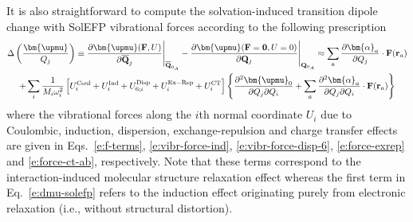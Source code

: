 \documentclass[a4paper,titlepage,twoside,fleqn,12pt]{book}
\newcommand{\BM}[1]{\bm{#1}}
\newcommand{\fderiv}[2]{\ensuremath{
    \frac{\partial #1}{\partial #2}}}
\newcommand{\sderivd}[3]{\ensuremath{
    \frac{\partial^2 #1}{\partial #2 \partial #3}
    }}
\begin{document}
\begin{refsection}
It is also straightforward to compute the 
solvation\hyp{}induced transition dipole change
with SolEFP vibrational forces according to the following prescription
%
\begin{multline} \label{e:dmu-solefp}
\Delta\left(\frac{{\BM \upmu}}{Q_j}\right) \equiv 
 \frac{\partial{\BM \upmu}({\bf F},U)}{\partial\overline {\bf Q}_j} \Bigg|_{\overline{\bf Q}_{0_A}} -  
 \frac{\partial{\BM \upmu}({\bf F}={\bf 0},U=0)}{\partial {\bf Q}_j} \Bigg|_{{\bf Q}_{0_A}} \approx
%
\sum_a 
\fderiv{{\BM \alpha}_{a}}{Q_j} \cdot {\bf F}({\bf r}_a) \\
+
\sum_i 
\frac{1}{M_i\omega_i^2} 
\left[
 U^{\rm Coul}_i   + 
 U^{\rm Ind}_i    +
 U^{\rm Disp}_{6;i}   +
 U^{\rm Ex-Rep}_i +
 U^{\rm CT}_i
\right]
%
\left\{ 
 \sderivd{{\BM \upmu}_0}{Q_j}{Q_i} 
 + \sum_a \sderivd{{\BM \alpha}_{a}}{Q_j}{Q_i} \cdot {\bf F}({\bf r}_a)
%
\right\}  
\end{multline}
%
where the vibrational forces along the $i$th normal coordinate
$U_i$ due to Coulombic, induction, dispersion, exchange\hyp{}repulsion
and charge transfer effects are given in Eqs.~\eqref{e:f-terms},
\eqref{e:vibr-force-ind}, \eqref{e:vibr-force-disp-6}, 
\eqref{e:force-exrep} and \eqref{e:force-ct-ab}, respectively.
Note that these terms correspond to the interaction\hyp{}induced
molecular structure relaxation effect
whereas the first term in Eq.~\eqref{e:dmu-solefp}
refers to the induction effect originating purely from
electronic relaxation (i.e., without structural distortion).


\end{refsection}
\end{document}
